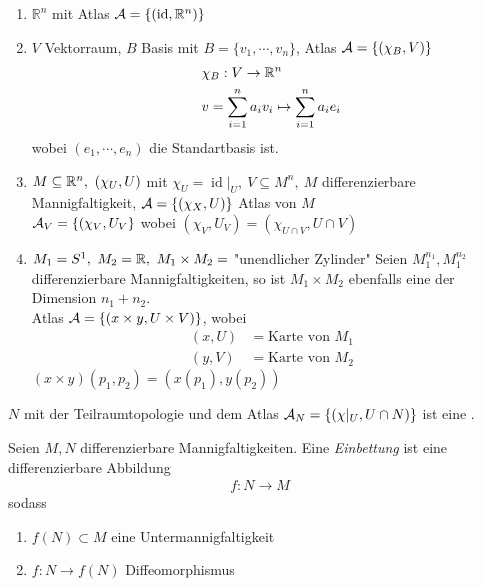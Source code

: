 \begin{bsp}
\begin{enumerate}
\item$\mathbb{R}^n$ mit Atlas $\mathcal{A} = \{(\operatorname{id}, \mathbb{R}^n)\}$
\item$V$ Vektorraum, $B$ Basis mit $B = \{v_1, \cdots, v_n\}$, Atlas $\mathcal{A} = \{(\chi_B, V)\}$
\begin{align*}
& \chi_B: V \rightarrow \mathbb{R}^n\\
& v = \sum^n_{i=1} a_i v_i \mapsto \sum_{i=1}^n a_i e_i
\end{align*}
wobei $(e_1, \cdots, e_n)$ die Standartbasis ist.
\item$M\subseteq \mathbb{R}^n,\ (\chi_U, U)$ mit $\chi_U = \operatorname{id}\vert_U,\ V \subseteq M^n,\ M$ differenzierbare Mannigfaltigkeit, $\mathcal{A} = \{(\chi_X, U)\}$ Atlas von $M$\\
$\mathcal{A}_V = \{(\chi_V, U_V\}$ wobei $(\chi_V, U_V) = (\chi_{U\cap V}, U\cap V)$
\item$M_1 = S^1,\ M_2 = \mathbb{R},\ M_1\times M_2 =$ "unendlicher Zylinder" 
Seien $M_1^{n_1}, M_1^{n_2}$ differenzierbare Mannigfaltigkeiten, so ist $M_1\times M_2$ ebenfalls eine \difM der Dimension $n_1 + n_2$.\\
Atlas $\mathcal{A} = \{(x\times y, U\times V)\}$, wobei 
\begin{align*}
(x, U) &= \text{Karte von } M_1\\
(y, V) &= \text{Karte von } M_2
\end{align*}
$(x\times y)(p_1, p_2) = (x(p_1), y(p_2))$
\end{enumerate}
\end{bsp}

\begin{bem}
$N$ mit der Teilraumtopologie und dem Atlas $\mathcal{A}_N = \{(\chi\vert_U, U\cap N)\}$ ist eine \difM.
\end{bem}

\begin{defs}
Seien $M, N$ differenzierbare Mannigfaltigkeiten. Eine \textit{Einbettung} ist eine differenzierbare Abbildung
\begin{align*}
f: N \rightarrow M
\end{align*}
sodass
\begin{enumerate}
\item$f(N)\subset M$ eine Untermannigfaltigkeit 
\item$f: N \rightarrow f(N)$ Diffeomorphismus
\end{enumerate}
\end{defs}

